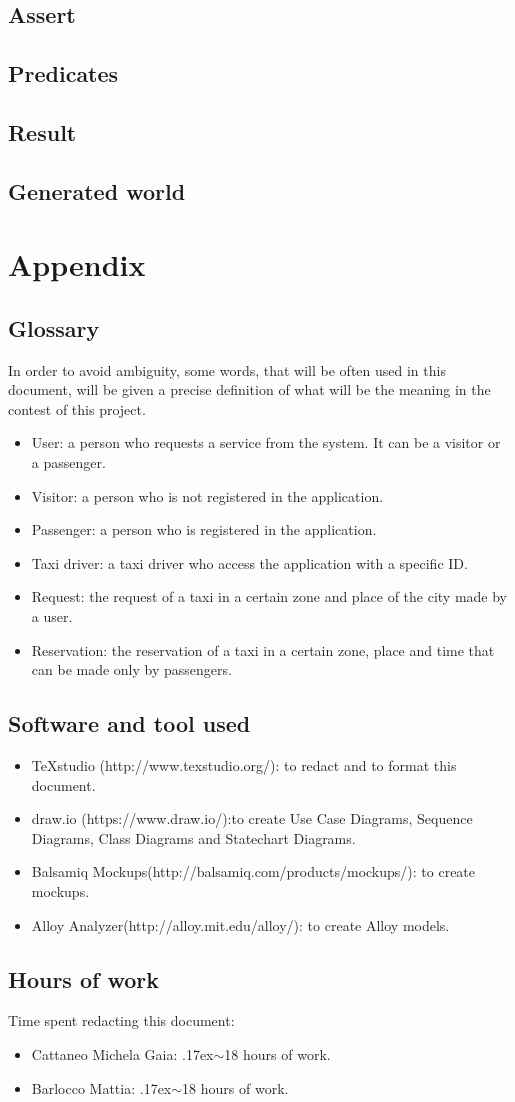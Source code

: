 \documentclass[18pt,oneside,a4paper, titlepage]{article}
\begin{document}
	\subsection{Assert}
	\subsection{Predicates}
	\subsection{Result}
	\subsection{Generated world}

\newpage
\section{Appendix}
	\subsection{Glossary}
		In order to avoid ambiguity, some words, that will be often used in this document, will be given a precise definition of what will be the meaning in the contest of this project.
		\begin{itemize}
			\item User: a person who requests a service from the system. It can be a visitor or a passenger.
			\item Visitor: a person who is not registered in the application.
			\item Passenger: a person who is registered in the application.
			\item Taxi driver: a taxi driver who access the application with a specific ID.
			\item Request: the request of a taxi in a certain zone and place of the city made by a user.
			\item Reservation: the reservation of a taxi in a certain zone, place and time that can be made only by passengers.
	\end{itemize}
	\subsection{Software and tool used}
		\begin{itemize}
			\item TeXstudio (http://www.texstudio.org/): to redact and to format this document.
			\item draw.io (https://www.draw.io/):to create Use Case Diagrams, Sequence Diagrams, Class Diagrams and Statechart Diagrams.
			\item Balsamiq Mockups(http://balsamiq.com/products/mockups/): to create mockups.
			\item Alloy Analyzer(http://alloy.mit.edu/alloy/): to create Alloy models.
		\end{itemize}
	
	\subsection{Hours of work}
		Time spent redacting this document:
		\begin{itemize}
			\item Cattaneo Michela Gaia: {\raise.17ex\hbox{$\scriptstyle\sim$}}18 hours of work.
			\item Barlocco Mattia: {\raise.17ex\hbox{$\scriptstyle\sim$}}18 hours of work.
		\end{itemize}
\end{document}
